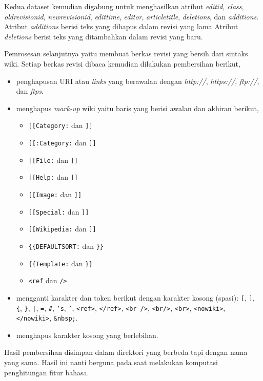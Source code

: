 Kedua dataset kemudian digabung untuk menghasilkan atribut \textit{editid},
\textit{class}, \textit{oldrevisionid}, \textit{newrevisionid},
\textit{edittime}, \textit{editor}, \textit{articletitle}, \textit{deletions},
dan \textit{additions}.
Atribut \textit{additions} berisi teks yang dihapus dalam revisi yang lama
Atribut \textit{deletions} berisi teks yang ditambahkan dalam revisi yang baru.

Pemrosesan selanjutnya yaitu membuat berkas revisi yang bersih dari sintaks
wiki.
Setiap berkas revisi dibaca kemudian dilakukan pembersihan berikut,

\begin{itemize}
\item penghapusan URI atau \textit{links} yang berawalan dengan
\textit{http://}, \textit{https://}, \textit{ftp://}, dan \textit{ftps}.
\item menghapus \textit{mark-up} wiki yaitu baris yang berisi awalan dan
akhiran berikut,
	\begin{itemize}
	\item \texttt{[[Category:} dan \texttt{]]}
	\item \texttt{[[:Category:} dan \texttt{]]}
	\item \texttt{[[File:} dan \texttt{]]}
	\item \texttt{[[Help:} dan \texttt{]]}
	\item \texttt{[[Image:} dan \texttt{]]}
	\item \texttt{[[Special:} dan \texttt{]]}
	\item \texttt{[[Wikipedia:} dan \texttt{]]}
	\item \texttt{\{\{DEFAULTSORT:} dan \texttt{\}\}}
	\item \texttt{\{\{Template:} dan \texttt{\}\}}
	\item \texttt{<ref} dan \texttt{/>}
	\end{itemize}
\item mengganti karakter dan token berikut dengan karakter kosong (spasi):
\texttt{[}, \texttt{]}, \texttt{\{}, \texttt{\}}, \texttt{|}, \texttt{=},
\texttt{\#}, \texttt{'s}, \texttt{'}, \texttt{<ref>}, \texttt{</ref>},
\texttt{<br />}, \texttt{<br/>}, \texttt{<br>}, \texttt{<nowiki>},
\texttt{</nowiki>}, \texttt{\&nbsp;}.
\item menghapus karakter kosong yang berlebihan.
\end{itemize}

Hasil pembersihan disimpan dalam direktori yang berbeda tapi dengan nama yang
sama.
Hasil ini nanti berguna pada saat melakukan komputasi penghitungan fitur
bahasa.


